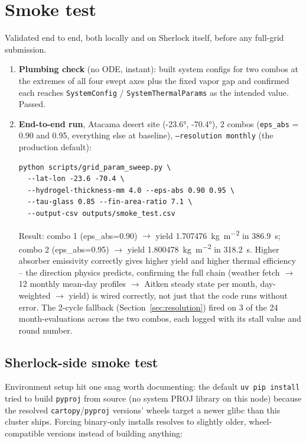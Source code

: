 \documentclass[11pt]{article}
\begin{document}
\section{Smoke test}\label{sec:smoke}

Validated end to end, both locally and on Sherlock itself, before any full-grid submission.

\begin{enumerate}
  \item \textbf{Plumbing check} (no ODE, instant): built system configs for two combos at the
  extremes of all four swept axes plus the fixed vapor gap and confirmed each reaches
  \texttt{SystemConfig} / \texttt{SystemThermalParams} as the intended value. Passed.
  \item \textbf{End-to-end run}, Atacama desert site (\ang{-23.6}, \ang{-70.4}), 2 combos
  (\texttt{eps\_abs} = 0.90 and 0.95, everything else at baseline), \texttt{--resolution monthly}
  (the production default):
\begin{verbatim}
python scripts/grid_param_sweep.py \
  --lat-lon -23.6 -70.4 \
  --hydrogel-thickness-mm 4.0 --eps-abs 0.90 0.95 \
  --tau-glass 0.85 --fin-area-ratio 7.1 \
  --output-csv outputs/smoke_test.csv
\end{verbatim}
  Result: combo 1 (eps\_abs=0.90) $\to$ yield \SI{1.707476}{\kilo\gram\per\meter\squared} in
  \SI{386.9}{\second}; combo 2 (eps\_abs=0.95) $\to$ yield
  \SI{1.800478}{\kilo\gram\per\meter\squared} in \SI{318.2}{\second}. Higher absorber emissivity
  correctly gives higher yield and higher thermal efficiency -- the direction physics predicts,
  confirming the full chain (weather fetch $\to$ 12 monthly mean-day profiles $\to$ Aitken steady
  state per month, day-weighted $\to$ yield) is wired correctly, not just that the code runs
  without error. The 2-cycle fallback (Section~\ref{sec:resolution}) fired on 3 of the 24
  month-evaluations across the two combos, each logged with its stall value and round number.

\end{enumerate}

\subsection{Sherlock-side smoke test}
Environment setup hit one snag worth documenting: the default \texttt{uv pip install} tried to
build \texttt{pyproj} from source (no system PROJ library on this node) because the resolved
\texttt{cartopy}/\texttt{pyproj} versions' wheels target a newer glibc than this cluster ships.
Forcing binary-only installs resolves to slightly older, wheel-compatible versions instead of
building anything:
\end{document}
